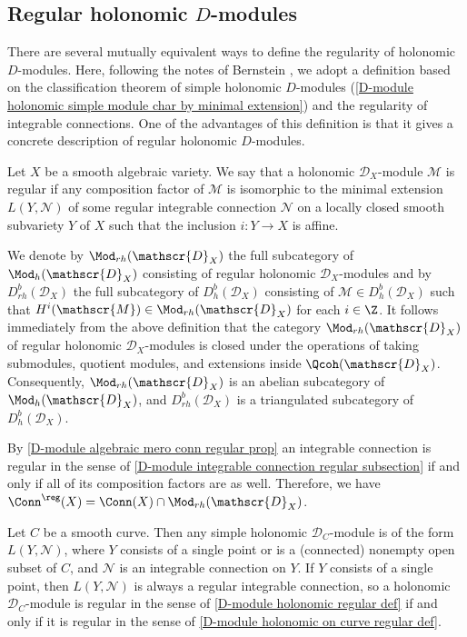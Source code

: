 \subsection{Regular holonomic \texorpdfstring{$D$}{D}-modules}
There are several mutually equivalent ways to define the regularity of holonomic $D$-modules. Here, following the notes of Bernstein \cite{Ber3}, we adopt a definition based on the classification theorem of simple holonomic $D$-modules (\cref{D-module holonomic simple module char by minimal extension}) and the regularity of integrable connections. One of the advantages of this definition is that it gives a concrete description of regular holonomic $D$-modules.

\begin{definition}\label{D-module holonomic regular def}
Let $X$ be a smooth algebraic variety. We say that a holonomic $\mathscr{D}_X$-module $\mathscr{M}$ is regular if any composition factor of $\mathscr{M}$ is isomorphic to the minimal extension $L(Y,\mathscr{N})$ of some regular integrable connection $\mathscr{N}$ on a locally closed smooth subvariety $Y$ of $X$ such that the inclusion $i:Y\to X$ is affine.
\end{definition}

We denote by $\Mod_{rh}(\mathscr{D}_X)$ the full subcategory of $\Mod_h(\mathscr{D}_X)$ consisting of regular holonomic $\mathscr{D}_X$-modules and by $D^b_{rh}(\mathscr{D}_X)$ the full subcategory of $D^b_h(\mathscr{D}_X)$ consisting of $\mathscr{M}\in D^b_h(\mathscr{D}_X)$ such that $H^i(\mathscr{M})\in\Mod_{rh}(\mathscr{D}_X)$ for each $i\in\Z$. It follows immediately from the above definition that the category $\Mod_{rh}(\mathscr{D}_X)$ of regular holonomic $\mathscr{D}_X$-modules is closed under the operations of taking submodules, quotient modules, and extensions inside $\Qcoh(\mathscr{D}_X)$. Consequently, $\Mod_{rh}(\mathscr{D}_X)$ is an abelian subcategory of $\Mod_h(\mathscr{D}_X)$, and $D^b_{rh}(\mathscr{D}_X)$ is a triangulated subcategory of $D^b_h(\mathscr{D}_X)$.

\begin{remark}
By \cref{D-module algebraic mero conn regular prop} an integrable connection is regular in the sense of \autoref{D-module integrable connection regular subsection} if and only if all of its composition factors are as well. Therefore, we have $\Conn^{\reg}(X)=\Conn(X)\cap\Mod_{rh}(\mathscr{D}_X)$.
\end{remark}

\begin{remark}
Let $C$ be a smooth curve. Then any simple holonomic $\mathscr{D}_C$-module is of the form $L(Y,\mathscr{N})$, where $Y$ consists of a single point or is a (connected) nonempty open subset of $C$, and $\mathscr{N}$ is an integrable connection on $Y$. If $Y$ consists of a single point, then $L(Y,\mathscr{N})$ is always a regular integrable connection, so a holonomic $\mathscr{D}_C$-module is regular in the sense of \cref{D-module holonomic regular def} if and only if it is regular in the sense of \cref{D-module holonomic on curve regular def}.
\end{remark}

